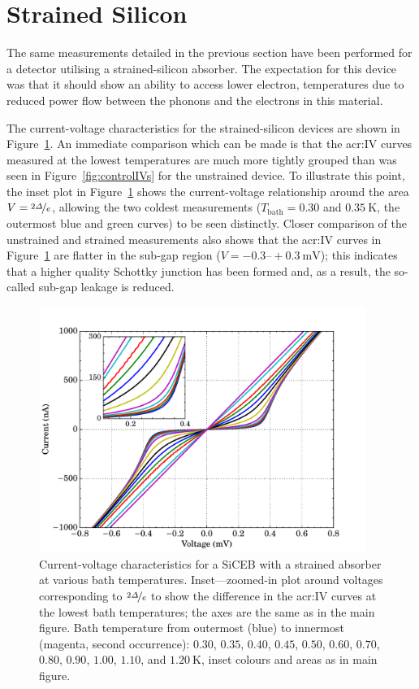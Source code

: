 \section{Strained Silicon}
The same measurements detailed in the previous section have been performed for a detector utilising a strained-silicon absorber. The expectation for this device was that it should show an ability to access lower electron, temperatures due to reduced power flow between the phonons and the electrons in this material.
\par
The current-voltage characteristics for the strained-silicon devices are shown in Figure~\ref{fig:strainedIVs}. An immediate comparison which can be made is that the \gls{acr:IV} curves measured at the lowest temperatures are much more tightly grouped than was seen in Figure~\ref{fig:controlIVs} for the unstrained device. To illustrate this point, the inset plot in Figure~\ref{fig:strainedIVs} shows the current-voltage relationship around the area $V = \nicefrac{2\varDelta}{e}$, allowing the two coldest measurements ($T_{\mathrm{bath}} = 0.30$ and $0.35~\mathrm{K}$, the outermost blue and green curves) to be seen distinctly. Closer comparison of the unstrained and strained measurements also shows that the \gls{acr:IV} curves in Figure~\ref{fig:strainedIVs} are flatter in the sub-gap region ($V = -0.3\mbox{--}+0.3~\mathrm{mV}$); this indicates that a higher quality Schottky junction has been formed and, as a result, the so-called sub-gap leakage is reduced.
\begin{figure}[tb]
\begin{center}
\includegraphics[width = 0.95\textwidth]{figures/strained_IVs}
\caption[Current-voltage characteristics for a SiCEB with a strained absorber]{Current-voltage characteristics for a SiCEB with a strained absorber at various bath temperatures. Inset---zoomed-in plot around voltages corresponding to $\nicefrac{2\varDelta}{e}$ to show the difference in the \gls{acr:IV} curves at the lowest bath temperatures; the axes are the same as in the main figure. Bath temperature from outermost (blue) to innermost (magenta, second occurrence): $0.30$, $0.35$, $0.40$, $0.45$, $0.50$, $0.60$, $0.70$, $0.80$, $0.90$, $1.00$, $1.10$, and $1.20~\mathrm{K}$, inset colours and areas as in main figure.}
\label{fig:strainedIVs}
\end{center}
\end{figure}
